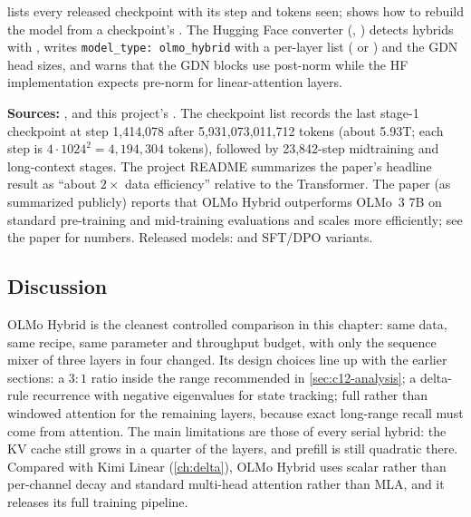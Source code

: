 \begin{implnote}[title={In the code: checkpoints and conversion}]
 lists every released
checkpoint with its step and tokens seen;  shows how to rebuild the model
from a checkpoint's . The Hugging Face converter
(, ) detects hybrids with
, writes \texttt{model\_type: olmo\_hybrid} with a per-layer
 list ( or ) and the GDN head
sizes, and warns that the GDN blocks use post-norm while the HF implementation expects pre-norm
for linear-attention layers.
\end{implnote}

\begin{results}
\textbf{Sources:} ,
 and this project's . The checkpoint list
records the last stage-1 checkpoint at step 1,414,078 after 5,931,073,011,712 tokens (about
5.93T; each step is $4\cdot1024^2 = 4{,}194{,}304$ tokens), followed by 23,842-step midtraining
and long-context stages. The project README summarizes the paper's headline result as ``about
$2\times$ data efficiency'' relative to the Transformer. The paper (as summarized publicly) reports
that OLMo Hybrid outperforms OLMo~3 7B on standard pre-training and mid-training evaluations and
scales more efficiently; see the paper for numbers. Released models: 
and SFT/DPO variants.
\end{results}

\subsection{Discussion}

OLMo Hybrid is the cleanest controlled comparison in this chapter: same data, same recipe, same
parameter and throughput budget, with only the sequence mixer of three layers in four changed. Its
design choices line up with the earlier sections: a $3{:}1$ ratio inside the range recommended in
\cref{sec:c12-analysis}; a delta-rule recurrence with negative eigenvalues for state tracking; full
rather than windowed attention for the remaining layers, because exact long-range recall must come
from attention. The main limitations are those of every serial hybrid: the KV cache still grows in
a quarter of the layers, and prefill is still quadratic there. Compared with Kimi Linear
(\cref{ch:delta}), OLMo Hybrid uses scalar rather than per-channel decay and standard multi-head
attention rather than MLA, and it releases its full training pipeline.
